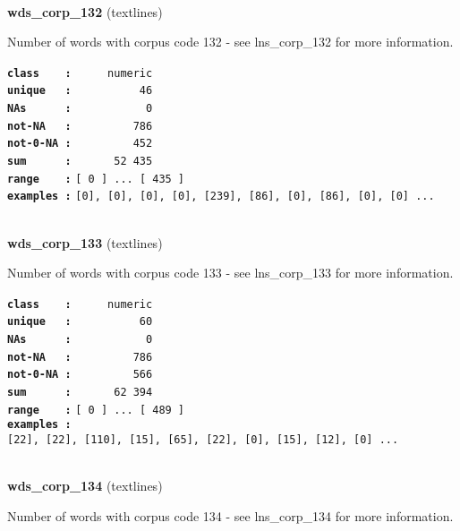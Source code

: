 \documentclass[]{article}
\begin{document}
~

\textbf{wds\_corp\_132} (textlines)

Number of words with corpus code 132 - see lns\_corp\_132 for more
information.

\textbf{\texttt{class\ \ \ \ :}} \texttt{~~~~~numeric}\\
\textbf{\texttt{unique\ \ \ :}} \texttt{~~~~~~~~~~46}\\
\textbf{\texttt{NAs\ \ \ \ \ \ :}} \texttt{~~~~~~~~~~~0}\\
\textbf{\texttt{not-NA\ \ \ :}} \texttt{~~~~~~~~~786}\\
\textbf{\texttt{not-0-NA\ :}} \texttt{~~~~~~~~~452}\\
\textbf{\texttt{sum\ \ \ \ \ \ :}} \texttt{~~~~~~52~435}\\
\textbf{\texttt{range\ \ \ \ :}}
\texttt{{[}\ 0\ {]}\ ...\ {[}\ 435\ {]}}\\
\textbf{\texttt{examples\ :}}
\texttt{{[}0{]},\ {[}0{]},\ {[}0{]},\ {[}0{]},\ {[}239{]},\ {[}86{]},\ {[}0{]},\ {[}86{]},\ {[}0{]},\ {[}0{]}\ ...}\\

~

\textbf{wds\_corp\_133} (textlines)

Number of words with corpus code 133 - see lns\_corp\_133 for more
information.

\textbf{\texttt{class\ \ \ \ :}} \texttt{~~~~~numeric}\\
\textbf{\texttt{unique\ \ \ :}} \texttt{~~~~~~~~~~60}\\
\textbf{\texttt{NAs\ \ \ \ \ \ :}} \texttt{~~~~~~~~~~~0}\\
\textbf{\texttt{not-NA\ \ \ :}} \texttt{~~~~~~~~~786}\\
\textbf{\texttt{not-0-NA\ :}} \texttt{~~~~~~~~~566}\\
\textbf{\texttt{sum\ \ \ \ \ \ :}} \texttt{~~~~~~62~394}\\
\textbf{\texttt{range\ \ \ \ :}}
\texttt{{[}\ 0\ {]}\ ...\ {[}\ 489\ {]}}\\
\textbf{\texttt{examples\ :}}
\texttt{{[}22{]},\ {[}22{]},\ {[}110{]},\ {[}15{]},\ {[}65{]},\ {[}22{]},\ {[}0{]},\ {[}15{]},\ {[}12{]},\ {[}0{]}\ ...}\\

~

\textbf{wds\_corp\_134} (textlines)

Number of words with corpus code 134 - see lns\_corp\_134 for more
information.
\end{document}
